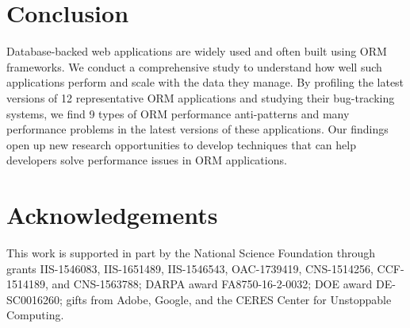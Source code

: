 \section{Conclusion}
Database-backed web applications are widely used and often built using ORM frameworks. We conduct a comprehensive study to understand how well such applications perform and scale with the data they manage. By profiling the latest versions of 12 representative ORM applications and studying their bug-tracking systems, we find 9 types of ORM performance anti-patterns and many performance problems in the latest versions of these applications. Our findings open up new research opportunities to develop techniques that can help developers solve performance issues in ORM applications.

\section{Acknowledgements}
This work is supported in part by the National Science Foundation through grants IIS-1546083, IIS-1651489, IIS-1546543, OAC-1739419, CNS-1514256, CCF-1514189, and CNS-1563788; DARPA award FA8750-16-2-0032; DOE award DE-SC0016260; gifts from Adobe, Google, and the CERES Center for Unstoppable Computing.